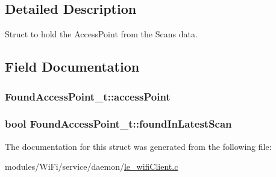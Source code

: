 \subsection{Detailed Description}
Struct to hold the Access\+Point from the Scan\textquotesingle{}s data. 

\subsection{Field Documentation}
\subsubsection[{\texorpdfstring{access\+Point}{accessPoint}}]{ Found\+Access\+Point\+\_\+t\+::access\+Point}\hypertarget{struct_found_access_point__t_a6b7363e0df47de7ec88139bffe116017}{}\label{struct_found_access_point__t_a6b7363e0df47de7ec88139bffe116017}
\subsubsection[{\texorpdfstring{found\+In\+Latest\+Scan}{foundInLatestScan}}]{\setlength{\rightskip}{0pt plus 5cm}bool Found\+Access\+Point\+\_\+t\+::found\+In\+Latest\+Scan}\hypertarget{struct_found_access_point__t_ab74cb84574b745e080e22aec18a4860d}{}\label{struct_found_access_point__t_ab74cb84574b745e080e22aec18a4860d}


The documentation for this struct was generated from the following file\+:\begin{DoxyCompactItemize}
\item 
modules/\+Wi\+Fi/service/daemon/\hyperlink{le__wifi_client_8c}{le\+\_\+wifi\+Client.\+c}\end{DoxyCompactItemize}
